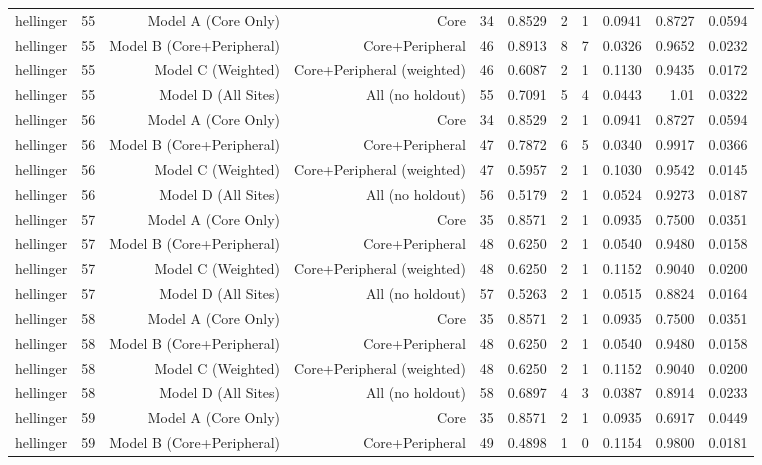 {\begin{longtable}{lrrrrrrrrrr}
  hellinger & 55 & Model A (Core Only) & Core & 34 & 0.8529 & 2 & 1 & 0.0941 & 0.8727 & 0.0594 \\
  hellinger & 55 & Model B (Core+Peripheral) & Core+Peripheral & 46 & 0.8913 & 8 & 7 & 0.0326 & 0.9652 & 0.0232 \\
  hellinger & 55 & Model C (Weighted) & Core+Peripheral (weighted) & 46 & 0.6087 & 2 & 1 & 0.1130 & 0.9435 & 0.0172 \\
  hellinger & 55 & Model D (All Sites) & All (no holdout) & 55 & 0.7091 & 5 & 4 & 0.0443 & 1.01 & 0.0322 \\
  hellinger & 56 & Model A (Core Only) & Core & 34 & 0.8529 & 2 & 1 & 0.0941 & 0.8727 & 0.0594 \\
  hellinger & 56 & Model B (Core+Peripheral) & Core+Peripheral & 47 & 0.7872 & 6 & 5 & 0.0340 & 0.9917 & 0.0366 \\
  hellinger & 56 & Model C (Weighted) & Core+Peripheral (weighted) & 47 & 0.5957 & 2 & 1 & 0.1030 & 0.9542 & 0.0145 \\
  hellinger & 56 & Model D (All Sites) & All (no holdout) & 56 & 0.5179 & 2 & 1 & 0.0524 & 0.9273 & 0.0187 \\
  hellinger & 57 & Model A (Core Only) & Core & 35 & 0.8571 & 2 & 1 & 0.0935 & 0.7500 & 0.0351 \\
  hellinger & 57 & Model B (Core+Peripheral) & Core+Peripheral & 48 & 0.6250 & 2 & 1 & 0.0540 & 0.9480 & 0.0158 \\
  hellinger & 57 & Model C (Weighted) & Core+Peripheral (weighted) & 48 & 0.6250 & 2 & 1 & 0.1152 & 0.9040 & 0.0200 \\
  hellinger & 57 & Model D (All Sites) & All (no holdout) & 57 & 0.5263 & 2 & 1 & 0.0515 & 0.8824 & 0.0164 \\
  hellinger & 58 & Model A (Core Only) & Core & 35 & 0.8571 & 2 & 1 & 0.0935 & 0.7500 & 0.0351 \\
  hellinger & 58 & Model B (Core+Peripheral) & Core+Peripheral & 48 & 0.6250 & 2 & 1 & 0.0540 & 0.9480 & 0.0158 \\
  hellinger & 58 & Model C (Weighted) & Core+Peripheral (weighted) & 48 & 0.6250 & 2 & 1 & 0.1152 & 0.9040 & 0.0200 \\
  hellinger & 58 & Model D (All Sites) & All (no holdout) & 58 & 0.6897 & 4 & 3 & 0.0387 & 0.8914 & 0.0233 \\
  hellinger & 59 & Model A (Core Only) & Core & 35 & 0.8571 & 2 & 1 & 0.0935 & 0.6917 & 0.0449 \\
  hellinger & 59 & Model B (Core+Peripheral) & Core+Peripheral & 49 & 0.4898 & 1 & 0 & 0.1154 & 0.9800 & 0.0181 \\

\end{longtable}}
